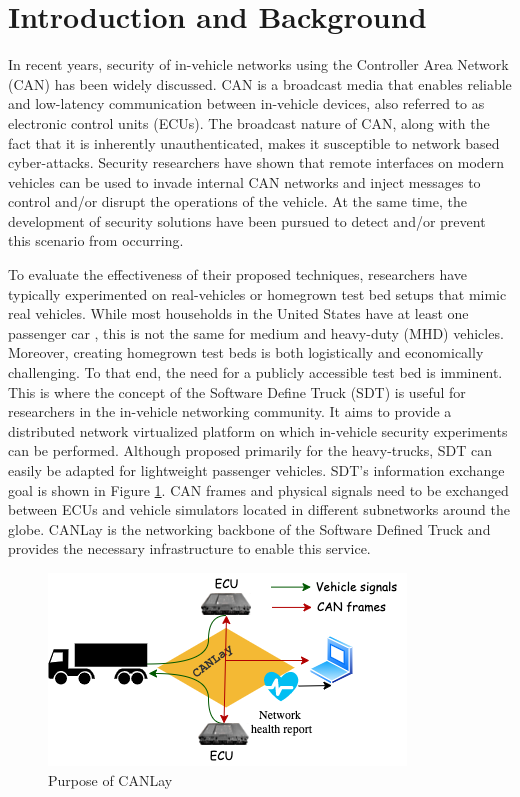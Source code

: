 \documentclass[letterpaper,twocolumn,12pt]{article}
\begin{document}
\section{Introduction and Background}
In recent years, security of in-vehicle networks using the Controller Area Network (CAN) has been widely discussed. CAN is a broadcast media that enables reliable and low-latency communication between in-vehicle devices, also referred to as electronic control units (ECUs). The broadcast nature of CAN, along with the fact that it is inherently unauthenticated, makes it susceptible to network based cyber-attacks. 
Security researchers have shown \cite{checkoway_comprehensive_2011, mukherjee_practical_2016,burakova_truck_2016} that remote interfaces on modern vehicles can be used to invade internal CAN networks and inject messages to control and/or disrupt the operations of the vehicle. At the same time, the development of security solutions have been pursued to detect and/or prevent this scenario from occurring.

To evaluate the effectiveness of their proposed techniques, researchers have typically experimented on real-vehicles or homegrown test bed setups that mimic real vehicles. 
While most households in the United States have at least one passenger car \cite{mathilde_carlier_number_2021}, this is not the same for medium and heavy-duty (MHD) vehicles. 
Moreover, creating homegrown test beds is both logistically and economically challenging. To that end, the need for a publicly accessible test bed is imminent. This is where the concept of the Software Define Truck (SDT) \cite{mukherjee_towards_2021} is useful for researchers in the in-vehicle networking community. It aims to provide a distributed network virtualized platform on which in-vehicle security experiments can be performed. Although proposed primarily for the heavy-trucks, SDT can easily be adapted for lightweight passenger vehicles. SDT's information exchange goal is shown in Figure \ref{fig:goal}. CAN frames and physical signals need to be exchanged between ECUs and vehicle simulators located in different subnetworks around the globe. CANLay is the networking backbone of the Software Defined Truck and provides the necessary infrastructure to enable this service.

\begin{figure}[]
    \centering
    \includegraphics[width=\linewidth]{images/design_goal.drawio.png}
    \caption{Purpose of CANLay}
    \label{fig:goal}
\end{figure}
\end{document}
